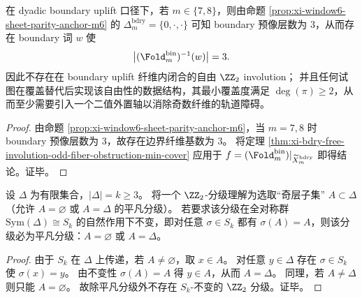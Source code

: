 \begin{corollary}\label{cor:xi-bdry-uplift-three-layer-needs-one-bit}
在 dyadic boundary uplift 口径下，若 \(m\in\{7,8\}\)，则由命题 \ref{prop:xi-window6-sheet-parity-anchor-m6} 的
\(
\Delta_m^{\mathrm{bdry}}=\{0,\cdot,\cdot\}
\)
可知 boundary 预像层数为 \(3\)，从而存在 boundary 词 \(w\) 使
\[
\bigl|(\Fold_m^{\mathrm{bin}})^{-1}(w)\bigr|=3.
\]
因此不存在在 boundary uplift 纤维内闭合的自由 \(\ZZ_2\) involution；
并且任何试图在覆盖替代后实现该自由性的数据结构，其最小覆盖度满足 \(\deg(\pi)\ge 2\)，从而至少需要引入一个二值外置轴以消除奇数纤维的轨道障碍。
\end{corollary}
\begin{proof}
由命题 \ref{prop:xi-window6-sheet-parity-anchor-m6}，当 \(m=7,8\) 时 boundary 预像层数为 \(3\)，故存在边界纤维基数为 \(3\)。
将定理 \ref{thm:xi-bdry-free-involution-odd-fiber-obstruction-min-cover} 应用于 \(f=(\Fold_m^{\mathrm{bin}})|_{\widetilde X_m^{\mathrm{bdry}}}\) 即得结论。证毕。
\end{proof}

\begin{theorem}\label{thm:xi-sym-invariant-z2-grading-trivial}
设 \(\Delta\) 为有限集合，\(|\Delta|=k\ge 3\)。
将一个 \(\ZZ_2\)-分级理解为选取“奇层子集” \(A\subset\Delta\)（允许 \(A=\varnothing\) 或 \(A=\Delta\) 的平凡分级）。
若要求该分级在全对称群 \(\mathrm{Sym}(\Delta)\cong S_k\) 的自然作用下不变，即对任意 \(\sigma\in S_k\) 都有 \(\sigma(A)=A\)，则该分级必为平凡分级：\(A=\varnothing\) 或 \(A=\Delta\)。
\end{theorem}
\begin{proof}
由于 \(S_k\) 在 \(\Delta\) 上传递，若 \(A\neq\varnothing\)，取 \(x\in A\)。
对任意 \(y\in\Delta\) 存在 \(\sigma\in S_k\) 使 \(\sigma(x)=y\)。
由不变性 \(\sigma(A)=A\) 得 \(y\in A\)，从而 \(A=\Delta\)。
同理，若 \(A\neq\Delta\) 则只能 \(A=\varnothing\)。
故除平凡分级外不存在 \(S_k\)-不变的 \(\ZZ_2\) 分级。证毕。
\end{proof}

